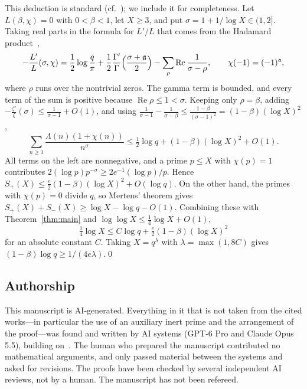 \documentclass[11pt]{amsart}
\begin{document}
This deduction is standard (cf.~\cite[Lemma~1]{Kerr}); we include it for completeness. Let $L(\beta,\chi)=0$ with $0<\beta<1$, let $X\ge3$, and put $\sigma=1+1/\log X\in(1,2]$. Taking
real parts in the formula for $L'/L$ that comes from the Hadamard product~\cite[p.~89]{Davenport},
\[
-\frac{L'}{L}(\sigma,\chi)=\frac12\log\frac q\pi
+\frac12\frac{\Gamma'}{\Gamma}\Bigl(\frac{\sigma+\mathfrak a}2\Bigr)
-\sum_\rho\operatorname{Re}\frac1{\sigma-\rho},\qquad \chi(-1)=(-1)^{\mathfrak a},
\]
where $\rho$ runs over the nontrivial zeros. The gamma term is bounded, and every term of the sum
is positive because $\operatorname{Re}\rho\le1<\sigma$. Keeping only $\rho=\beta$, adding
$-\frac{\zeta'}{\zeta}(\sigma)\le\frac1{\sigma-1}+O(1)$, and using
$\frac1{\sigma-1}-\frac1{\sigma-\beta}\le\frac{1-\beta}{(\sigma-1)^2}=(1-\beta)(\log X)^2$,
\[
\sum_{n\ge1}\frac{\Lambda(n)(1+\chi(n))}{n^\sigma}\le\tfrac12\log q+(1-\beta)(\log X)^2+O(1).
\]
All terms on the left are nonnegative, and a prime $p\le X$ with $\chi(p)=1$ contributes
$2(\log p)p^{-\sigma}\ge2e^{-1}(\log p)/p$. Hence
$S_+(X)\le\frac e2(1-\beta)(\log X)^2+O(\log q)$.
On the other hand, the primes with $\chi(p)=0$ divide $q$, so Mertens' theorem gives
$S_+(X)+S_-(X)\ge\log X-\log q-O(1)$. Combining these with Theorem~\ref{thm:main} and
$\log\log X\le\frac14\log X+O(1)$,
\[
\tfrac14\log X\le C\log q+\tfrac e2(1-\beta)(\log X)^2
\]
for an absolute constant $C$. Taking $X=q^\lambda$ with $\lambda=\max(1,8C)$ gives
$(1-\beta)\log q\ge1/(4e\lambda)$.\qed

\subsection*{Authorship}
This manuscript is AI-generated. Everything in it that is not taken from the cited works---in
particular the use of an auxiliary inert prime and the arrangement of the proof---was found and
written by AI systems (GPT-6 Pro and Claude Opus 5.5), building on~\cite{OpenAI,Banks,Green,Kerr}. The human
who prepared the manuscript contributed no mathematical arguments, and only passed material
between the systems and asked for revisions. The proofs have been checked by several independent
AI reviews, not by a human. The manuscript has not been refereed.
\end{document}
